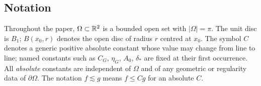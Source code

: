 \subsection*{Notation}

Throughout the paper, $\Omega\subset\mathbb{R}^2$ is a bounded open set with
$|\Omega|=\pi$.  The unit disc is $B_1$; $B(x_0,r)$ denotes the open
disc of radius $r$ centred at $x_0$.  The symbol $C$ denotes a generic
positive absolute constant whose value may change from line to line;
named constants such as $C_G$, $\eta_G$, $A_0$, $\delta_*$ are fixed
at their first occurrence.  All \emph{absolute} constants are
independent of $\Omega$ and of any geometric or regularity data of
$\partial\Omega$.  The notation $f\lesssim g$ means $f\le Cg$ for an
absolute $C$.
